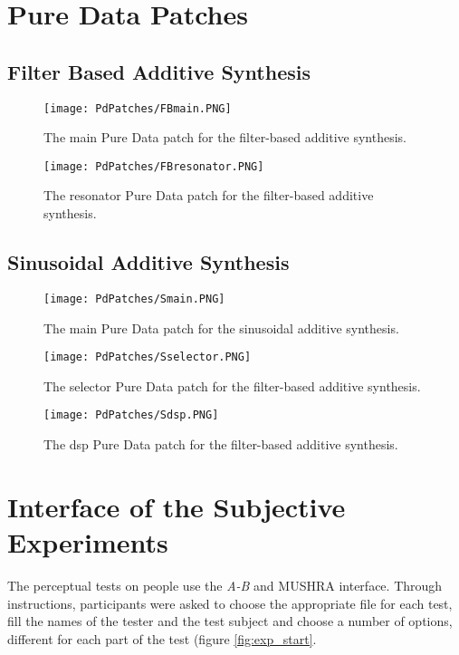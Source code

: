 \chapter{Pure Data Patches}\label{ap:pd_patches}

\section{Filter Based Additive Synthesis}
\begin{figure}[H]
  \centering
    \texttt{[image: PdPatches/FBmain.PNG]}
      \caption{The main Pure Data patch for the filter-based additive synthesis.}
      \label{fig:FBmain}
\end{figure}

\begin{figure}[H]
  \centering
    \texttt{[image: PdPatches/FBresonator.PNG]}
      \caption{The resonator Pure Data patch for the filter-based additive synthesis.}
      \label{fig:FBres}
\end{figure}

\section{Sinusoidal Additive Synthesis}

\begin{figure}[H]
  \centering
    \texttt{[image: PdPatches/Smain.PNG]}
      \caption{The main Pure Data patch for the sinusoidal additive synthesis.}
      \label{fig:Smain}
\end{figure}

\begin{figure}[H]
  \centering
    \texttt{[image: PdPatches/Sselector.PNG]}
      \caption{The selector Pure Data patch for the filter-based additive synthesis.}
      \label{fig:Ssel}
\end{figure}

\begin{figure}[H]
  \centering
    \texttt{[image: PdPatches/Sdsp.PNG]}
      \caption{The dsp Pure Data patch for the filter-based additive synthesis.}
      \label{fig:Sdsp}
\end{figure}

\chapter{Interface of the Subjective Experiments}\label{ap:experiments}
The perceptual tests on people use the \textit{A-B} and \gls{MUSHRA} interface. Through instructions, participants were asked to choose the appropriate file for each test, fill the names of the tester and the test subject and choose a number of options, different for each part of the test (figure \ref{fig:exp_start}.

